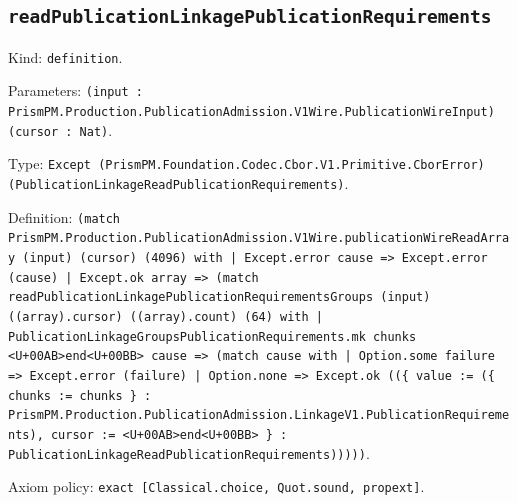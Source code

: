 \documentclass[11pt]{article}
\begin{document}
\subsection*{\texttt{readPublicationLinkagePublicationRequirements}}
\noindent Kind: \texttt{definition}.\par
\noindent Parameters: \texttt{(input : PrismPM.Production.PublicationAdmission.V1Wire.PublicationWireInput) (cursor : Nat)}.\par
\noindent Type: \texttt{Except (PrismPM.Foundation.Codec.Cbor.V1.Primitive.CborError) (PublicationLinkageReadPublicationRequirements)}.\par
\noindent Definition: \texttt{(match PrismPM.Production.PublicationAdmission.V1Wire.publicationWireReadArray (input) (cursor) (4096) with | Except.error cause => Except.error (cause) | Except.ok array => (match readPublicationLinkagePublicationRequirementsGroups (input) ((array).cursor) ((array).count) (64) with | PublicationLinkageGroupsPublicationRequirements.mk chunks <U+00AB>end<U+00BB> cause => (match cause with | Option.some failure => Except.error (failure) | Option.none => Except.ok ((\{ value := (\{ chunks := chunks \} : PrismPM.Production.PublicationAdmission.LinkageV1.PublicationRequirements), cursor := <U+00AB>end<U+00BB> \} : PublicationLinkageReadPublicationRequirements)))))}.\par
\noindent Axiom policy: \texttt{exact [Classical.choice, Quot.sound, propext]}.\par
\end{document}
